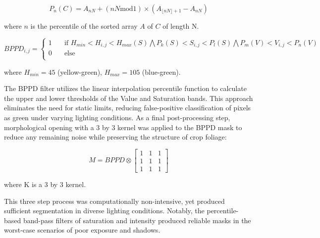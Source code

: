 \documentclass[authoryear]{elsarticle}
\begin{document}
\begin{equation}
  P_{n}(C) = A_{nN} + (nN \text{mod} 1) \times (A_{\lfloor nN \rfloor + 1}-A_{nN})
  \label{eq:percentile}
\end{equation}
\begin{flushleft}
where $n$ is the percentile of the  sorted array $A$ of $C$ of length N.
\end{flushleft}

\begin{equation}
BPPD_{i,j} =
  \begin{cases}
    1  & \quad \text{if } H_{min}<H_{i,j}<H_{max}(S) \bigwedge P_{k}(S)< S_{i,j} <P_{l}(S) \bigwedge P_{m}(V)< V_{i,j}<P_{n}(V)\text{ }\\
    0  & \quad \text{else}\\
  \end{cases}
  \label{eq:bppd}
\end{equation}
\begin{flushleft}
where $H_{min}=45$ (yellow-green), $H_{max}=105$ (blue-green).
\end{flushleft}

The BPPD filter utilizes the linear interpolation percentile function
to calculate the upper and lower thresholds of the Value and
Saturation bands. This approach eliminates the need for static limits,
reducing false-positive classification of pixels as green under
varying lighting conditions. As a final post-processing step,
morphological opening with a 3 by 3 kernel was applied to the BPPD
mask to reduce any remaining noise while preserving the structure of
crop foliage:

\begin{equation}
M = BPPD \otimes
\begin{bmatrix}
       1 & 1 & 1 \\
       1 & 1 & 1 \\
       1 & 1 & 1
     \end{bmatrix}
\label{eq:morph_opening}
\end{equation}
\begin{flushleft}
where K is a 3 by 3 kernel.
\end{flushleft}

This three step process was computationally non-intensive, yet produced
sufficient segmentation in diverse lighting conditions. Notably, the
percentile-based band-pass filters of saturation and intensity
produced reliable masks in the worst-case scenarios of poor exposure and shadows.
\end{document}
